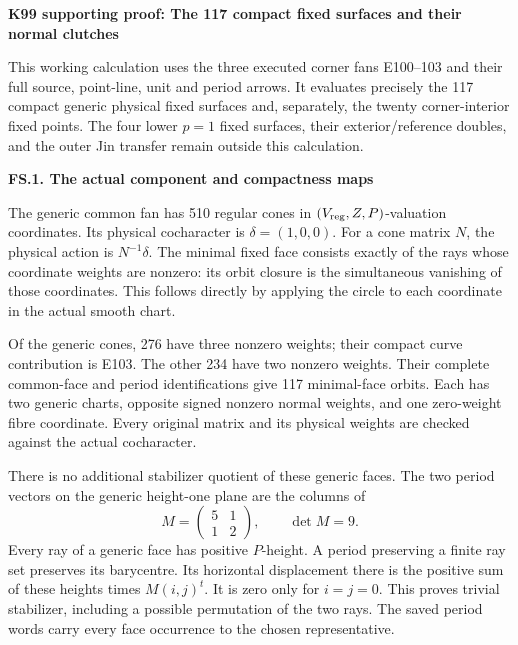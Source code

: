 \par\bigskip\noindent\textbf{K99 supporting proof: The 117 compact fixed surfaces and their normal clutches}\par\nobreak
This working calculation uses the three executed corner fans
E100--103 and their full source, point-line, unit and period arrows.
It evaluates precisely the 117 compact generic physical fixed
surfaces and, separately, the twenty corner-interior fixed points.
The four lower \(p=1\) fixed surfaces, their exterior/reference
doubles, and the outer Jin transfer remain outside this calculation.

\par

\medskip\noindent\textbf{FS.1. The actual component and compactness maps}

\par\nobreak

The generic common fan has 510 regular cones in
\((V_{\rm reg},Z,P)\)-valuation coordinates. Its physical
cocharacter is \(\delta=(1,0,0)\). For a cone matrix \(N\),
the physical action is \(N^{-1}\delta\). The minimal fixed
face consists exactly of the rays whose coordinate weights
are nonzero: its orbit closure is the simultaneous vanishing
of those coordinates. This follows directly by applying
the circle to each coordinate in the actual smooth chart.

Of the generic cones, 276 have three nonzero weights;
their compact curve contribution is E103. The other
234 have two nonzero weights. Their complete common-face
and period identifications give 117 minimal-face orbits.
Each has two generic charts, opposite signed nonzero
normal weights, and one zero-weight fibre coordinate.
Every original matrix and its physical weights are
checked against the actual cocharacter.

There is no additional stabilizer quotient of these
generic faces. The two period vectors on the generic
height-one plane are the columns of
\[
 M=\begin{pmatrix}5&1\\1&2\end{pmatrix},\qquad\det M=9.
 \tag{FS.1}
\]
Every ray of a generic face has positive \(P\)-height.
A period preserving a finite ray set preserves its
barycentre. Its horizontal displacement there is
the positive sum of these heights times \(M(i,j)^t\).
It is zero only for \(i=j=0\). This proves trivial
stabilizer, including a possible permutation of the
two rays. The saved period words carry every
face occurrence to the chosen representative.

